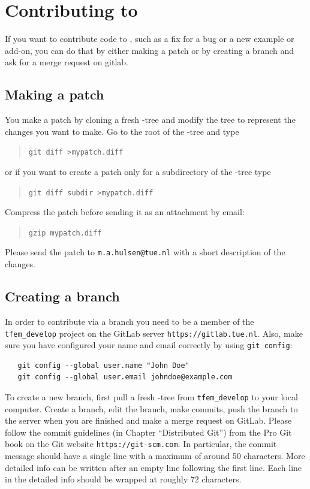 \section{Contributing to \tfem}

If you want to contribute code to \tfem, such as a fix for a bug or a new example or add-on, you can do that by 
either making a patch or by creating a branch and ask for a merge request on gitlab. 

\subsection{Making a patch}
\label{sec:patches}

You make a patch by cloning a fresh \tfem-tree and modify the tree to represent the changes you want to make. Go to the root of the \tfem-tree and type
\begin{quote}
   \texttt{git diff >mypatch.diff}
\end{quote}
or if you want to create a patch only for a subdirectory of the \tfem-tree type
\begin{quote}
   \texttt{git diff subdir >mypatch.diff}
\end{quote}
Compress the patch before sending it as an attachment by email:
\begin{quote}
   \texttt{gzip mypatch.diff}
\end{quote}
Please send the patch to \texttt{m.a.hulsen@tue.nl} with a short description of the changes.

\subsection{Creating a branch}
\label{sec:branch}

In order to contribute via a branch you need to be a member of the \texttt{tfem\_develop} project on the GitLab server \texttt{https://gitlab.tue.nl}.
Also, make sure you have configured your name and email correctly by using \texttt{git config}:
\begin{verbatim}
   git config --global user.name "John Doe"
   git config --global user.email johndoe@example.com
\end{verbatim}
To create a new branch, first pull a fresh \tfem-tree from \texttt{tfem\_develop} to your local computer.
Create a branch, edit the branch, make commits, push the branch to the server when you are finished and make a merge request on GitLab. Please follow the commit guidelines (in Chapter ``Distributed Git'') from the Pro Git book on the Git website \texttt{https://git-scm.com}. In particular, the commit message should have a single line with a maximum of around 50 characters. More detailed info can be written after an empty line following the first line. Each line in the detailed info should be wrapped at roughly 72 characters.

